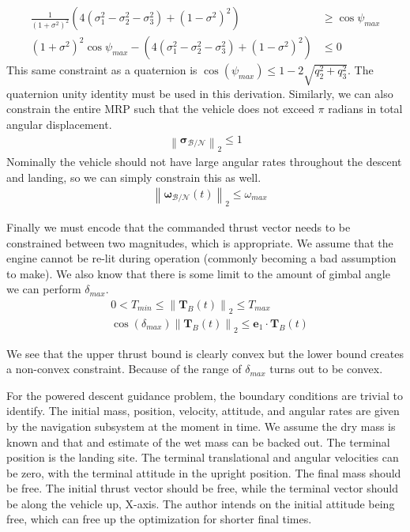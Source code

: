 %
\begin{align}
	\frac{1}{(1+\sigma^2)^2}\left(4(\sigma_1^2 - \sigma_2^2 - \sigma_3^2) + (1-\sigma^2)^2 \right) &\geq \cos{\psi_{max}} \\
	(1+\sigma^2)^2\cos{\psi_{max}} - \left(4(\sigma_1^2 - \sigma_2^2 - \sigma_3^2) + (1-\sigma^2)^2 \right) &\leq 0
\end{align}
This same constraint as a quaternion is $\cos(\psi_{max}) \leq 1-2\sqrt{q_{2}^{2}+q_{3}^{2}}$. The quaternion unity identity must be used in this derivation. Similarly, we can also constrain the entire MRP such that the vehicle does not exceed $\pi$ radians in total angular displacement.
\begin{align}
	\left \lVert \boldsymbol{\sigma}_\mathcal{B/N} \right \lVert_2 \leq 1
\end{align}
Nominally the vehicle should not have large angular rates throughout the descent and landing, so we can simply constrain this as well.
\begin{align}
& \left \lVert \bm{\omega}_\mathcal{B/N}(t) \right \lVert_2 \leq \omega_{max}
\end{align}

Finally we must encode that the commanded thrust vector needs to be constrained between two magnitudes, which is appropriate. We assume that the engine cannot be re-lit during operation (commonly becoming a bad assumption to make). We also know that there is some limit to the amount of gimbal angle we can perform $\delta_{max}$.
\begin{align}
& 0 < T_{min} \leq \left \lVert \bm{T}_B(t) \right \lVert_2 \leq T_{max} \\
& \cos(\delta_{max}) \left \lVert \bm{T}_B(t) \right \lVert_2 \leq \bm{e}_1 \cdot \bm{T}_B(t)
\end{align}




We see that the upper thrust bound is clearly convex but the lower bound creates a non-convex constraint. Because of the range of  $\delta_{max}$ turns out to be convex.

For the powered descent guidance problem, the boundary conditions are trivial to identify. The initial mass, position, velocity, attitude, and angular rates are given by the navigation subsystem at the moment in time. We assume the dry mass is known and that and estimate of the wet mass can be backed out. The terminal position is the landing site. The terminal translational and angular velocities can be zero, with the terminal attitude in the upright position. The final mass should be free. The initial thrust vector should be free, while the terminal vector should be along the vehicle up, X-axis. The author intends on the initial attitude being free, which can free up the optimization for shorter final times.

